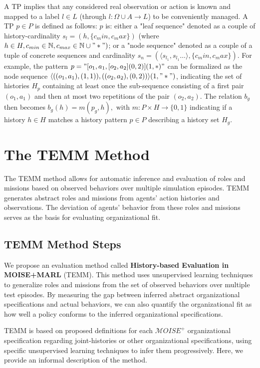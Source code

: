 \documentclass[sigconf,anonymous]{aamas}
\begin{document}
A TP implies that any considered real observation or action is known and mapped to a label $l \in L$ (through $l: \Omega \cup A \to L$) to be conveniently managed. A TP $p \in P$ is defined as follows: $p$ is: either a "leaf sequence" denoted as a couple of history-cardinality $s_l = (h, \{c_min,c_max\})$ (where $h \in H, c_{min} \in \mathbb{N}, c_{max} \in \mathbb{N} \cup "*")$; or a "node sequence" denoted as a couple of a tuple of concrete sequences and cardinality $s_n = (\langle s_{l_1}, s_{l_1}\dots \rangle, \{c_min,c_max\})$. For example, the pattern $p = \allowbreak "[o_1,a_1,[o_2,a_2](0,2)](1,*)"$ can be formalized as the node sequence $\allowbreak \langle ((o_1,a_1),(1,1)), ((o_2,a_2),(0,2))\rangle(1,"*")$, indicating the set of histories $H_p$ containing at least once the sub-sequence consisting of a first pair $(o_1,a_1)$ and then at most two repetitions of the pair $(o_2,a_2)$.
The relation $b_g$ then becomes $b_g(h) = m(p_g,h), \text{ with } m: P \times H \to \{0,1\}$ indicating if a history $h \in H$ matches a history pattern $p \in P$ describing a history set $H_g$.

\section{The TEMM Method}
\label{sec:TEMM_algorithm}
The TEMM method allows for automatic inference and evaluation of roles and missions based on observed behaviors over multiple simulation episodes. TEMM generates abstract roles and missions from agents' action histories and observations. The deviation of agents' behavior from these roles and missions serves as the basis for evaluating organizational fit.

\subsection{TEMM Method Steps}

We propose an evaluation method called \textbf{History-based Evaluation in MOISE+MARL} (TEMM). This method uses unsupervised learning techniques to generalize roles and missions from the set of observed behaviors over multiple test episodes. By measuring the gap between inferred abstract organizational specifications and actual behaviors, we can also quantify the organizational fit as how well a policy conforms to the inferred organizational specifications.

TEMM is based on proposed definitions for each $\mathcal{M}OISE^+$ organizational specification regarding joint-histories or other organizational specifications, using specific unsupervised learning techniques to infer them progressively. Here, we provide an informal description of the method\footnotemark[1].
%
\end{document}

